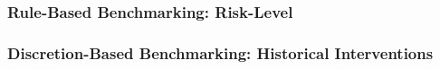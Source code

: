\documentclass{beamer}
\begin{document}
\begin{frame}
  \frametitle{Rule-Based Benchmarking: Risk-Level}
\end{frame}


\begin{frame}
  \frametitle{Discretion-Based Benchmarking: Historical Interventions}
\end{frame}
\end{document}
